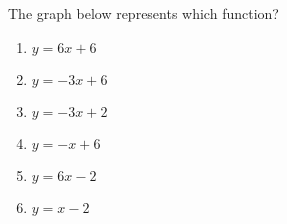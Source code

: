 \bigskip

\item The graph below represents which function? 

    \begin{minipage}{0.5\columnwidth}
        \begin{enumerate}
            \item $y = 6x + 6$
            \item $y = -3x + 6$
            \item $y = -3x + 2$
            \item $y = -x+ 6$
            \item $y = 6x -2$
            \item $y = x -2$
        \end{enumerate}
    \end{minipage}
    \begin{minipage}{0.5\columnwidth}
    \end{minipage}



